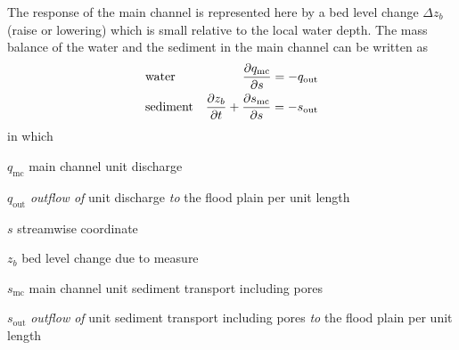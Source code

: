 The response of the main channel is represented here by a bed level change $\Delta z_b$  (raise or lowering) which is small relative to the local water depth.
The mass balance of the water and the sediment in the main channel can be written as
%
\begin{align}
&\text{water} & \pdiff{q_\text{mc}}{s} = -q_\text{out} \label{Eq2} \\
&\text{sediment} & \pdiff{z_b}{t} + \pdiff{s_\text{mc}}{s} = -s_\text{out} \label{Eq3}
\end{align}
%
in which
%
\begin{symbollist}
\item[$q_\text{mc}$] main channel unit discharge 
\item[$q_\text{out}$] \emph{outflow of} unit discharge \emph{to} the flood plain per unit length 
\item[$s$] streamwise coordinate 
\item[$z_b$] bed level change due to measure 
\item[$s_\text{mc}$] main channel unit sediment transport including pores 
\item[$s_\text{out}$] \emph{outflow of} unit sediment transport including pores \emph{to} the flood plain per unit length 
\end{symbollist}

